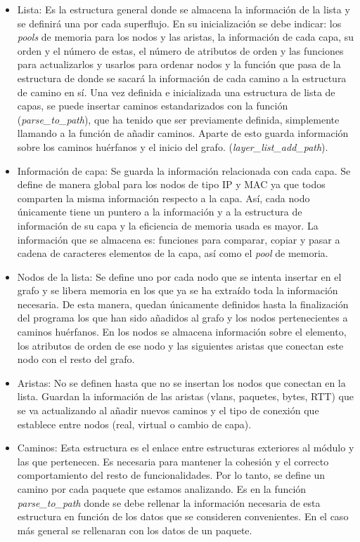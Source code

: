 \documentclass[twoside, 12pt]{epstfg}
\begin{document}
\begin{itemize}
    \item Lista: Es la estructura general donde se almacena la información de la lista y se definirá una por cada superflujo. En su inicialización se debe indicar: los \textit{pools} de memoria para los nodos y las aristas, la información de cada capa, su orden y el número de estas, el número de atributos de orden y las funciones para actualizarlos y usarlos para ordenar nodos y la función que pasa de la estructura de donde se sacará la información de cada camino a la estructura de camino en sí. Una vez definida e inicializada una estructura de lista de capas, se puede insertar caminos estandarizados con la función (\textit{parse\_to\_path}), que ha tenido que ser previamente definida, simplemente llamando a la función de añadir caminos. Aparte de esto guarda información sobre los caminos huérfanos y el inicio del grafo.
    (\textit{layer\_list\_add\_path}).
    \item Información de capa: Se guarda la información relacionada con cada capa. Se define de manera global para los nodos de tipo IP y MAC ya que todos comparten la misma información respecto a la capa. Así, cada nodo únicamente tiene un puntero a la información y a la estructura de información de su capa y la eficiencia de memoria usada es mayor. La información que se almacena es: funciones para comparar, copiar y pasar a cadena de caracteres elementos de la capa, así como el \textit{pool} de memoria.
    \item Nodos de la lista: Se define uno por cada nodo que se intenta insertar en el grafo y se libera memoria en los que ya se ha extraído toda la información necesaria. De esta manera, quedan únicamente definidos hasta la finalización del programa los que han sido añadidos al grafo y los nodos pertenecientes a caminos huérfanos.  En los nodos se almacena información sobre el elemento, los atributos de orden de ese nodo y las siguientes aristas que conectan este nodo con el resto del grafo.
    \item Aristas: No se definen hasta que no se insertan los nodos que conectan en la lista. Guardan la información de las aristas (vlans, paquetes, bytes, RTT) que se va actualizando al añadir nuevos caminos y el tipo de conexión que establece entre nodos (real, virtual o cambio de capa).
    \item Caminos: Esta estructura es el enlace entre estructuras exteriores al módulo y las que pertenecen. Es necesaria para mantener la cohesión y el correcto comportamiento del resto de funcionalidades. Por lo tanto, se define un camino por cada paquete que estamos analizando. Es en la función \textit{parse\_to\_path} donde se debe rellenar la información necesaria de esta estructura en función de los datos que se consideren convenientes. En el caso más general se rellenaran con los datos de un paquete.
\end{itemize}
\end{document}
